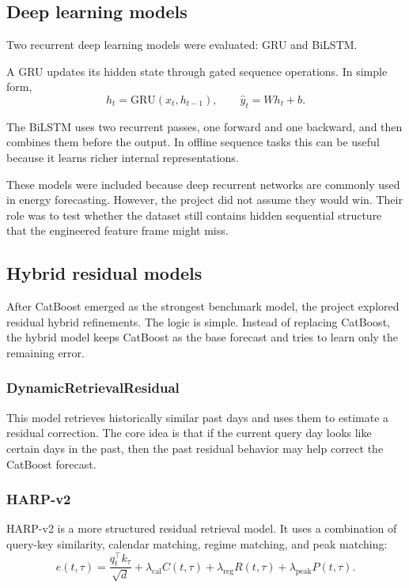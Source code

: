 \documentclass[conference]{IEEEtran}
\begin{document}
\subsection{Deep learning models}
Two recurrent deep learning models were evaluated: GRU and BiLSTM.

A GRU updates its hidden state through gated sequence operations. In simple form,
\begin{equation}
h_t = \mathrm{GRU}(x_t, h_{t-1}), \qquad \hat{y}_t = Wh_t + b.
\end{equation}

The BiLSTM uses two recurrent passes, one forward and one backward, and then combines them before the output. In offline sequence tasks this can be useful because it learns richer internal representations.

These models were included because deep recurrent networks are commonly used in energy forecasting. However, the project did not assume they would win. Their role was to test whether the dataset still contains hidden sequential structure that the engineered feature frame might miss.

\subsection{Hybrid residual models}
After CatBoost emerged as the strongest benchmark model, the project explored residual hybrid refinements. The logic is simple. Instead of replacing CatBoost, the hybrid model keeps CatBoost as the base forecast and tries to learn only the remaining error.

\subsubsection{DynamicRetrievalResidual}
This model retrieves historically similar past days and uses them to estimate a residual correction. The core idea is that if the current query day looks like certain days in the past, then the past residual behavior may help correct the CatBoost forecast.

\subsubsection{HARP-v2}
HARP-v2 is a more structured residual retrieval model. It uses a combination of query-key similarity, calendar matching, regime matching, and peak matching:
\begin{equation}
e(t,\tau)=\frac{q_t^\top k_\tau}{\sqrt{d}}+\lambda_{\mathrm{cal}}C(t,\tau)+\lambda_{\mathrm{reg}}R(t,\tau)+\lambda_{\mathrm{peak}}P(t,\tau).
\end{equation}
\end{document}
